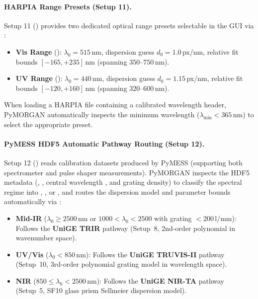\paragraph{HARPIA Range Presets (Setup 11).}
Setup 11 () provides two dedicated optical range presets selectable in the GUI via :
\begin{itemize}
  \item \textbf{Vis Range} (): $\lambda_0 = 515$\,nm, dispersion guess $d_0 = 1.0$\,px/nm, relative fit bounds $[-165, +235]$\,nm (spanning $350$--$750$\,nm).
  \item \textbf{UV Range} (): $\lambda_0 = 440$\,nm, dispersion guess $d_0 = 1.15$\,px/nm, relative fit bounds $[-120, +160]$\,nm (spanning $320$--$600$\,nm).
\end{itemize}
When loading a HARPIA  file containing a calibrated wavelength header, PyMORGAN automatically inspects the minimum wavelength ($\lambda_{\min} < 365$\,nm) to select the appropriate preset.

\paragraph{PyMESS HDF5 Automatic Pathway Routing (Setup 12).}
Setup 12 () reads  calibration datasets produced by PyMESS (supporting both spectrometer  and pulse shaper  measurements). PyMORGAN inspects the HDF5 metadata (, , central wavelength , and grating density) to classify the spectral regime into , , or , and routes the dispersion model and parameter bounds automatically via :
\begin{itemize}
  \item \textbf{Mid-IR} ($\lambda_0 \ge 2500$\,nm or $1000 < \lambda_0 < 2500$ with grating $< 200$\,l/mm): Follows the \textbf{UniGE TRIR} pathway (Setup~8, 2nd-order polynomial in wavenumber space).
  \item \textbf{UV/Vis} ($\lambda_0 < 850$\,nm): Follows the \textbf{UniGE TRUVIS-II} pathway (Setup~10, 3rd-order polynomial grating model in wavelength space).
  \item \textbf{NIR} ($850 \le \lambda_0 < 2500$\,nm): Follows the \textbf{UniGE NIR-TA} pathway (Setup~5, SF10 glass prism Sellmeier dispersion model).
\end{itemize}


